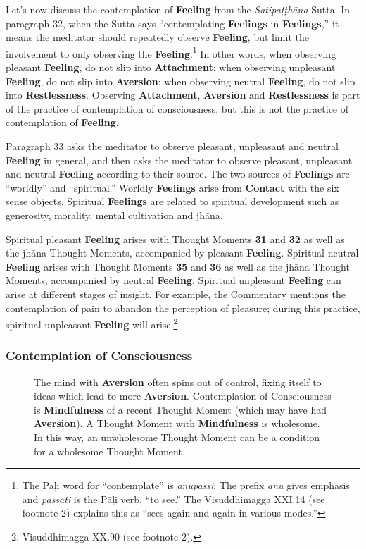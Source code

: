 Let’s now discuss the contemplation of \textbf{Feeling} from the \textit{Satipaṭṭhāna} Sutta. In paragraph 32, when the Sutta says “contemplating \textbf{Feelings} in \textbf{Feelings},” it means the meditator should repeatedly observe \textbf{Feeling}, but limit the involvement to only observing the \textbf{Feeling}.\footnote{The Pāḷi word for “contemplate” is \textit{anupassi}; The prefix \textit{anu} gives emphasis and \textit{passati} is the Pāḷi verb, “to see.” The Visuddhimagga XXI.14 (see footnote 2) explains this as “sees again and again in various modes.”} In other words, when observing pleasant \textbf{Feeling}, do not slip into \textbf{Attachment}; when observing unpleasant \textbf{Feeling}, do not slip into \textbf{Aversion}; when observing neutral \textbf{Feeling}, do not slip into \textbf{Restlessness}. Observing \textbf{Attachment}, \textbf{Aversion} and \textbf{Restlessness} is part of the practice of contemplation of consciousness, but this is not the practice of contemplation of \textbf{Feeling}.

Paragraph 33 asks the meditator to observe pleasant, unpleasant and neutral \textbf{Feeling} in general, and then asks the meditator to observe pleasant, unpleasant and neutral \textbf{Feeling} according to their source. The two sources of \textbf{Feelings} are “worldly” and “spiritual.” Worldly \textbf{Feelings} arise from \textbf{Contact} with the six sense objects. Spiritual \textbf{Feelings} are related to spiritual development such as generosity, morality, mental cultivation and jhāna.

Spiritual pleasant \textbf{Feeling} arises with Thought Moments \textbf{31} and \textbf{32} as well as the jhāna Thought Moments, accompanied by pleasant \textbf{Feeling}. Spiritual neutral \textbf{Feeling} arises with Thought Moments \textbf{35} and \textbf{36} as well as the jhāna Thought Moments, accompanied by neutral \textbf{Feeling}. Spiritual unpleasant \textbf{Feeling} can arise at different stages of insight. For example, the Commentary mentions the contemplation of pain to abandon the perception of pleasure; during this practice, spiritual unpleasant \textbf{Feeling} will arise.\footnote{Visuddhimagga XX.90 (see footnote 2).}

\subsubsection*{Contemplation of Consciousness}

\begin{figure}[H]
\centering

\caption{The mind with \textbf{Aversion} often spins out of control, fixing itself to ideas which lead to more \textbf{Aversion}. Contemplation of Consciousness is \textbf{Mindfulness} of a recent Thought Moment (which may have had \textbf{Aversion}). A Thought Moment with \textbf{Mindfulness} is wholesome. In this way, an unwholesome Thought Moment can be a condition for a wholesome Thought Moment.}
\label{fig:Aversion}
\end{figure}

